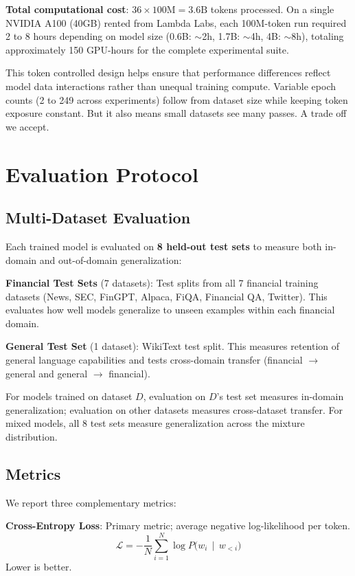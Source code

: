 \textbf{Total computational cost}: $36 \times 100\text{M} = 3.6\text{B}$ tokens processed. On a single NVIDIA A100 (40GB) rented from Lambda Labs, each 100M-token run required 2 to 8 hours depending on model size (0.6B: $\sim$2h, 1.7B: $\sim$4h, 4B: $\sim$8h), totaling approximately 150 GPU-hours for the complete experimental suite.

This token controlled design helps ensure that performance differences reflect model data interactions rather than unequal training compute. Variable epoch counts (2 to 249 across experiments) follow from dataset size while keeping token exposure constant. But it also means small datasets see many passes. A trade off we accept.

\section{Evaluation Protocol}

\subsection{Multi-Dataset Evaluation}

Each trained model is evaluated on \textbf{8 held-out test sets} to measure both in-domain and out-of-domain generalization:

\textbf{Financial Test Sets} (7 datasets): Test splits from all 7 financial training datasets (News, SEC, FinGPT, Alpaca, FiQA, Financial QA, Twitter). This evaluates how well models generalize to unseen examples within each financial domain.

\textbf{General Test Set} (1 dataset): WikiText test split. This measures retention of general language capabilities and tests cross-domain transfer (financial $\to$ general and general $\to$ financial).

For models trained on dataset $D$, evaluation on $D$'s test set measures in-domain generalization; evaluation on other datasets measures cross-dataset transfer. For mixed models, all 8 test sets measure generalization across the mixture distribution.

\subsection{Metrics}

We report three complementary metrics:

\textbf{Cross-Entropy Loss}: Primary metric; average negative log-likelihood per token.
\begin{equation*}
    \mathcal{L} = -\frac{1}{N}\sum_{i=1}^{N} \log P\bigl(w_i \,\mid\, w_{<i}\bigr)
\end{equation*}
Lower is better.

